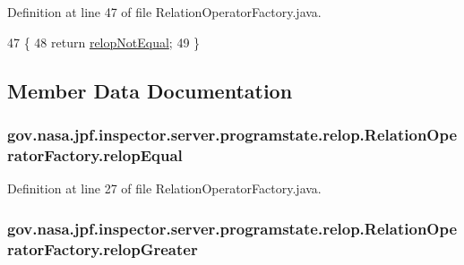 Definition at line 47 of file Relation\+Operator\+Factory.\+java.


\begin{DoxyCode}
47                                               \{
48     \textcolor{keywordflow}{return} \hyperlink{classgov_1_1nasa_1_1jpf_1_1inspector_1_1server_1_1programstate_1_1relop_1_1_relation_operator_factory_a8a066f50d2e7774da6c87831d4f67fb5}{relopNotEqual};
49   \}
\end{DoxyCode}


\subsection{Member Data Documentation}
\subsubsection[{\texorpdfstring{relop\+Equal}{relopEqual}}]{ gov.\+nasa.\+jpf.\+inspector.\+server.\+programstate.\+relop.\+Relation\+Operator\+Factory.\+relop\+Equal\hspace{0.3cm}{\ttfamily [protected]}}\hypertarget{classgov_1_1nasa_1_1jpf_1_1inspector_1_1server_1_1programstate_1_1relop_1_1_relation_operator_factory_aa9ca043a95c8ef7463150ab75ed87be5}{}\label{classgov_1_1nasa_1_1jpf_1_1inspector_1_1server_1_1programstate_1_1relop_1_1_relation_operator_factory_aa9ca043a95c8ef7463150ab75ed87be5}


Definition at line 27 of file Relation\+Operator\+Factory.\+java.

\subsubsection[{\texorpdfstring{relop\+Greater}{relopGreater}}]{ gov.\+nasa.\+jpf.\+inspector.\+server.\+programstate.\+relop.\+Relation\+Operator\+Factory.\+relop\+Greater\hspace{0.3cm}{\ttfamily [protected]}}\hypertarget{classgov_1_1nasa_1_1jpf_1_1inspector_1_1server_1_1programstate_1_1relop_1_1_relation_operator_factory_aacbe16ebf0143f9211bf5d2c4af38e71}{}\label{classgov_1_1nasa_1_1jpf_1_1inspector_1_1server_1_1programstate_1_1relop_1_1_relation_operator_factory_aacbe16ebf0143f9211bf5d2c4af38e71}


